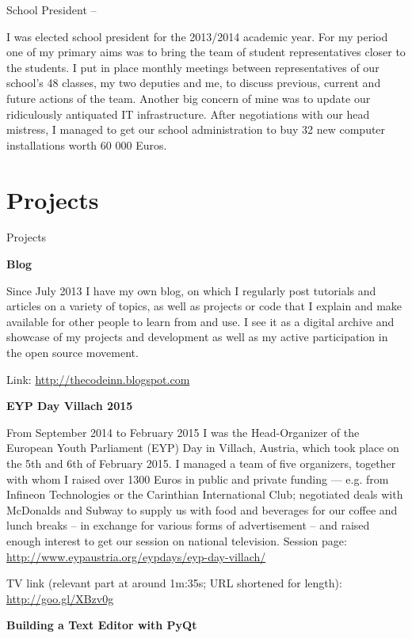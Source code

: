\begin{body}
School President \hfill {} -- 

\begin{detail}
I was elected school president for the 2013/2014 academic year. For my period one of my primary aims was to bring the team of student representatives closer to the students. I put in place monthly meetings between representatives of our school's 48 classes, my two deputies and me, to discuss previous, current and future actions of the team. Another big concern of mine was to update our ridiculously antiquated IT infrastructure. After negotiations with our head mistress, I managed to get our school administration to buy 32 new computer installations worth 60 000 Euros.
\end{detail}


\section{Projects}
{Projects}

\textbf{Blog}

\begin{detail}
Since July 2013 I have my own blog, on which I regularly post tutorials and articles on a variety of topics, as well as projects or code that I explain and make available for other people to learn from and use. I see it as a digital archive and showcase of my projects and development as well as my active participation in the open source movement.

Link: \href{http://thecodeinn.blogspot.com}{http://thecodeinn.blogspot.com}
\end{detail}
\vspace{0.4cm}
\textbf{EYP Day Villach 2015}

\begin{detail}
From September 2014 to February 2015 I was the Head-Organizer of the European Youth Parliament (EYP) Day in Villach, Austria, which took place on the 5th and 6th of February 2015. I managed a team of five organizers, together with whom I raised over 1300 Euros in public and private funding --- e.g. from Infineon Technologies or the Carinthian International Club; negotiated deals with McDonalds and Subway to supply us with food and beverages for our coffee and lunch breaks -- in exchange for various forms of advertisement -- and raised enough interest to get our session on national television.
Session page: \href{http://www.eypaustria.org/eypdays/eyp-day-villach/}{http://www.eypaustria.org/eypdays/eyp-day-villach/}
\par
TV link (relevant part at around 1m:35s; URL shortened for length): \href{http://goo.gl/XBzv0g}{http://goo.gl/XBzv0g}
\end{detail}
\vspace{0.4cm}
\textbf{Building a Text Editor with PyQt}


\end{body}
